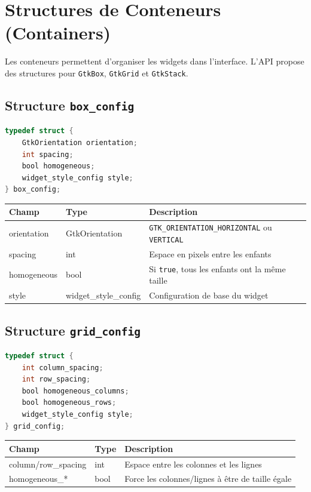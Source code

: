 \section{Structures de Conteneurs (Containers)}

Les conteneurs permettent d'organiser les widgets dans l'interface. L'API propose des structures pour \texttt{GtkBox}, \texttt{GtkGrid} et \texttt{GtkStack}.

\subsection{Structure \texttt{box\_config}}

\begin{lstlisting}[language=C]
typedef struct {
    GtkOrientation orientation;
    int spacing;
    bool homogeneous;
    widget_style_config style;
} box_config;
\end{lstlisting}

\begin{center}
\begin{tabular}{|l|l|p{5cm}|}
\hline
\textbf{Champ} & \textbf{Type} & \textbf{Description} \\
\hline
orientation & GtkOrientation & \texttt{GTK\_ORIENTATION\_HORIZONTAL} ou \texttt{VERTICAL} \\
\hline
spacing & int & Espace en pixels entre les enfants \\
\hline
homogeneous & bool & Si \texttt{true}, tous les enfants ont la même taille \\
\hline
style & widget\_style\_config & Configuration de base du widget \\
\hline
\end{tabular}
\end{center}

\subsection{Structure \texttt{grid\_config}}

\begin{lstlisting}[language=C]
typedef struct {
    int column_spacing;
    int row_spacing;
    bool homogeneous_columns;
    bool homogeneous_rows;
    widget_style_config style;
} grid_config;
\end{lstlisting}

\begin{center}
\begin{tabular}{|l|l|p{5cm}|}
\hline
\textbf{Champ} & \textbf{Type} & \textbf{Description} \\
\hline
column/row\_spacing & int & Espace entre les colonnes et les lignes \\
\hline
homogeneous\_* & bool & Force les colonnes/lignes à être de taille égale \\
\hline
\end{tabular}
\end{center}

